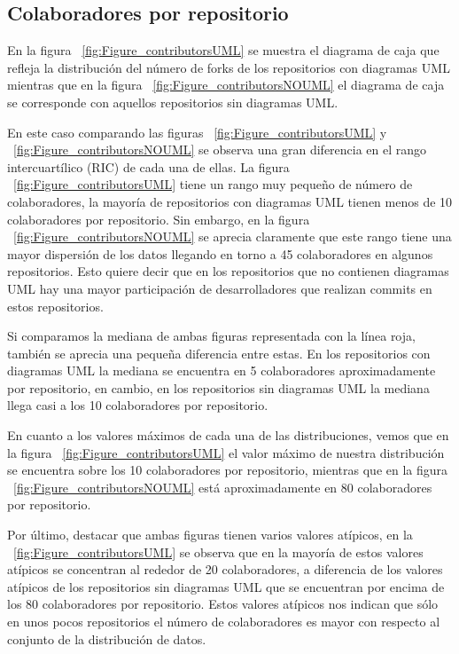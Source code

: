 \documentclass[a4paper, 12pt]{book}
\begin{document}
\subsection{Colaboradores por repositorio}
\label{sec:Diagrama de caja de los colaboradores por repositorio}
En la figura ~\ref{fig:Figure_contributorsUML} se muestra el diagrama de caja que refleja la distribución del número de forks de los repositorios con diagramas UML mientras que en la figura ~\ref{fig:Figure_contributorsNOUML} el diagrama de caja se corresponde con aquellos repositorios sin diagramas UML.


En este caso comparando las figuras ~\ref{fig:Figure_contributorsUML} y ~\ref{fig:Figure_contributorsNOUML} se observa una gran diferencia en el rango intercuartílico (RIC) de cada una de ellas.
La figura ~\ref{fig:Figure_contributorsUML} tiene un rango muy pequeño de número de colaboradores, la mayoría de repositorios con diagramas UML tienen menos de 10 colaboradores por repositorio.
Sin embargo, en la figura ~\ref{fig:Figure_contributorsNOUML} se aprecia claramente que este rango tiene una mayor dispersión de los datos llegando en torno a 45 colaboradores en algunos repositorios. 
Esto quiere decir que en los repositorios que no contienen diagramas UML hay una mayor participación de desarrolladores que realizan commits en estos repositorios.


Si comparamos la mediana de ambas figuras representada con la línea roja, también se aprecia una pequeña diferencia entre estas. 
En los repositorios con diagramas UML la mediana se encuentra en 5 colaboradores aproximadamente por repositorio, en cambio, en los repositorios sin diagramas UML la mediana llega casi a los 10 colaboradores por repositorio.


En cuanto a los valores máximos de cada una de las distribuciones, vemos que en la figura ~\ref{fig:Figure_contributorsUML} el valor máximo de nuestra distribución se encuentra sobre los 10 colaboradores por repositorio, mientras que en la figura ~\ref{fig:Figure_contributorsNOUML} está aproximadamente en 80 colaboradores por repositorio.


Por último, destacar que ambas figuras tienen varios valores atípicos, en la ~\ref{fig:Figure_contributorsUML} se observa que en la mayoría de estos valores atípicos se concentran al rededor de 20 colaboradores, a diferencia de los valores atípicos de los repositorios sin diagramas UML que se encuentran por encima de los 80 colaboradores por repositorio. 
Estos valores atípicos nos indican que sólo en unos pocos repositorios el número de colaboradores es mayor con respecto al conjunto de la distribución de datos.
\end{document}
